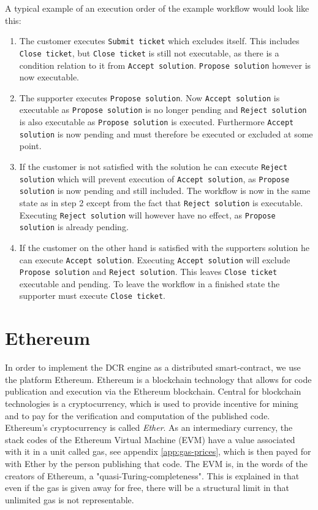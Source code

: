 \documentclass{article}
\begin{document}
		A typical example of an execution order of the example workflow would look like this:
		\begin{enumerate}
			\item The customer executes \texttt{Submit ticket} which excludes itself. 
			This includes \texttt{Close ticket}, but \texttt{Close ticket} is still not executable, as there is a condition relation to it from \texttt{Accept solution}.
			\texttt{Propose solution} however is now executable.
			\item The supporter executes \texttt{Propose solution}. Now \texttt{Accept solution} is executable as \texttt{Propose solution} is no longer pending and \texttt{Reject solution} is also executable as \texttt{Propose solution} is executed. 
			Furthermore \texttt{Accept solution} is now pending and must therefore be executed or excluded at some point.
			\item If the customer is not satisfied with the solution he can execute \texttt{Reject solution} which will prevent execution of \texttt{Accept solution}, as \texttt{Propose solution} is now pending and still included. 
			The workflow is now in the same state as in step 2 except from the fact that \texttt{Reject solution} is executable. 
			Executing \texttt{Reject solution} will however have no effect, as \texttt{Propose solution} is already pending.
			\item If the customer on the other hand is satisfied with the supporters solution he can execute \texttt{Accept solution}.
			Executing \texttt{Accept solution} will exclude \texttt{Propose solution} and \texttt{Reject solution}.
			This leaves \texttt{Close ticket} executable and pending.
			To leave the workflow in a finished state the supporter must execute \texttt{Close ticket}. 
		\end{enumerate}

	\section{Ethereum}
		In order to implement the DCR engine as a distributed smart-contract, we use the platform Ethereum. 
		Ethereum is a blockchain technology that allows for code publication and execution via the Ethereum blockchain.  
		Central for blockchain technologies is a cryptocurrency, which is used to provide incentive for mining and to pay for the verification and computation of the published code.
		Ethereum's cryptocurrency is called \emph{Ether}.
		As an intermediary currency, the stack codes of the Ethereum Virtual Machine (EVM) have a value associated with it in a unit called gas, see appendix \ref{app:gas-prices}, which is then payed for with Ether by the person publishing that code.
		The EVM is, in the words of the creators of Ethereum, a "quasi-Turing-completeness"\cite{yellow-paper}.
		This is explained in that even if the gas is given away for free, there will be a structural limit in that unlimited gas is not representable.
\end{document}

